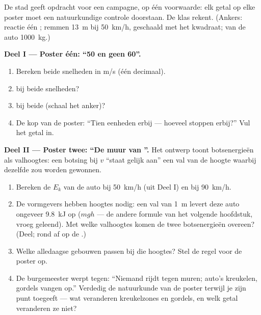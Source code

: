 \begin{problem}\label{pb:g9:kinetic-energy-safety:1}
De stad geeft opdracht voor een campagne, op één voorwaarde: elk getal
op elke poster moet een natuurkundige controle doorstaan. De klas
rekent. (Ankers: reactie één ; remmen \qty{13}{m} bij
\qty{50}{km/h}, geschaald met het kwadraat;  van de auto
\qty{1000}{kg}.)

\medskip\noindent\textbf{Deel I --- Poster één: ``50 en geen 60''.}
\begin{enumerate}
  \item Bereken beide snelheden in \unit{m/s} (één decimaal).
  \item {} bij beide snelheden?
  \item {} bij beide (schaal het anker)?
  \item De kop van de poster: ``Tien eenheden
         erbij --- hoeveel  stoppen
        erbij?'' Vul het getal in.
\end{enumerate}

\medskip\noindent\textbf{Deel II --- Poster twee: ``De muur van
''.}
Het ontwerp toont botsenergieën als valhoogtes: een botsing bij
 $v$ ``staat gelijk aan'' een val van de hoogte waarbij
dezelfde  zou worden gewonnen.
\begin{enumerate}[resume]
  \item Bereken de $E_k$ van de auto bij \qty{50}{km/h} (uit Deel I)
        en bij \qty{90}{km/h}.
  \item De vormgevers hebben hoogtes nodig: een val van \qty{1}{m}
        levert deze auto ongeveer \qty{9.8}{kJ} op ($m g h$ --- de
        andere formule van het volgende hoofdstuk, vroeg geleend). Met
        welke valhoogtes komen de twee botsenergieën overeen? (Deel;
        rond af op de .)
  \item Welke alledaagse gebouwen passen bij die hoogtes? Stel de
        regel voor de poster op.
  \item De burgemeester werpt tegen: ``Niemand rijdt tegen muren;
        auto's kreukelen, gordels vangen op.'' Verdedig de natuurkunde
        van de poster terwijl je zijn punt toegeeft --- wat veranderen
        kreukelzones en gordels, en welk getal veranderen ze niet?
\end{enumerate}


\end{problem}
